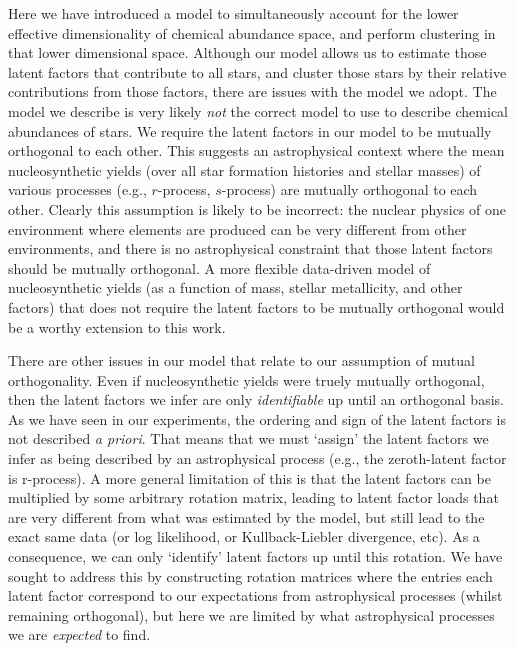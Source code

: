 \documentclass[twocolumn]{aastex62}
\begin{document}
Here we have introduced a model to simultaneously account for the lower
effective dimensionality of chemical abundance space, and perform clustering
in that lower dimensional space. Although our model allows us to estimate
those latent factors that contribute to all stars, and cluster those stars by
their relative contributions from those factors, there are issues with the
model we adopt. The model we describe is very likely \emph{not} the correct
model to use to describe chemical abundances of stars. We require the latent
factors in our model to be mutually orthogonal to each other. This suggests
an astrophysical context where the mean nucleosynthetic yields (over all star
formation histories and stellar masses) of various
processes (e.g., $r$-process, $s$-process) are mutually orthogonal to each
other. Clearly this assumption is likely to be incorrect: the nuclear physics
of one environment where elements are produced  can be very different from
other environments, and there is no astrophysical constraint that those
latent factors should be mutually orthogonal.
A more flexible data-driven model of nucleosynthetic yields (as a function of mass,
stellar metallicity, and other factors) that does not require the latent
factors to be mutually orthogonal would be a worthy extension to this work.

There are other issues in our model that relate to our assumption of mutual
orthogonality. Even if nucleosynthetic yields were truely mutually orthogonal,
then the latent factors we infer are only \emph{identifiable} up until an
orthogonal basis. As we have seen in our experiments, the ordering and sign 
of the latent factors is not described \emph{a priori}. That means that we
must `assign' the latent factors we infer as being described by an astrophysical
process (e.g., the zeroth-latent factor is r-process). A more general limitation
of this is that the latent factors can be multiplied by some arbitrary rotation
matrix, leading to latent factor loads that are very different from what was
estimated by the model, but still lead to the exact same data (or log likelihood,
or Kullback-Liebler divergence, etc). As a consequence, we can only `identify'
latent factors up until this rotation. We have sought to address this by constructing
rotation matrices where the entries each latent factor correspond to our expectations
from astrophysical processes (whilst remaining orthogonal), but here we are limited
by what astrophysical processes we are \emph{expected} to find.
\end{document}
